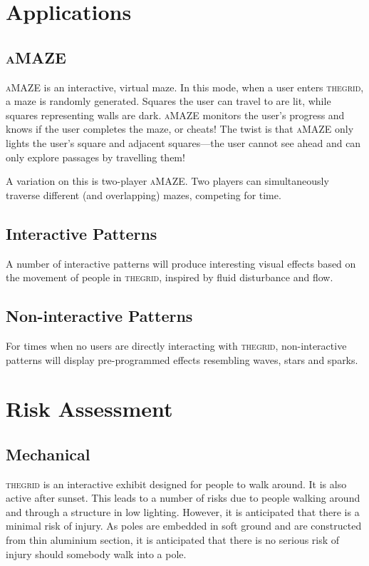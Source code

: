 \documentclass[12pt]{article} %
\newcommand{\thegrid}{\textsc{the\textperiodcentered grid}\xspace}
\newcommand{\amaze}{\textsc{aMAZE}\xspace}
\begin{document}
\section{Applications}
\subsection{\amaze}
\amaze is an interactive, virtual maze.  In this mode, when a user enters \thegrid, a maze is randomly generated.  Squares the user can travel to are lit, while squares representing walls are dark.  \amaze monitors the user's progress and knows if the user completes the maze, or cheats!  The twist is that \amaze only lights the user's square and adjacent squares---the user cannot see ahead and can only explore passages by travelling them!

A variation on this is two-player \amaze.  Two players can simultaneously traverse different (and overlapping) mazes, competing for time.

\subsection{Interactive Patterns}
A number of interactive patterns will produce interesting visual effects based on the movement of people in \thegrid, inspired by fluid disturbance and flow.

\subsection{Non-interactive Patterns}
For times when no users are directly interacting with \thegrid, non-interactive patterns will display pre-programmed effects resembling waves, stars and sparks.

\clearpage
\section{Risk Assessment}
\subsection{Mechanical}
\thegrid is an interactive exhibit designed for people to walk around.  It is also active after sunset.  This leads to a number of risks due to people walking around and through a structure in low lighting.  However, it is anticipated that there is a minimal risk of injury.  As poles are embedded in soft ground and are constructed from thin aluminium section, it is anticipated that there is no serious risk of injury should somebody walk into a pole.
\end{document}

